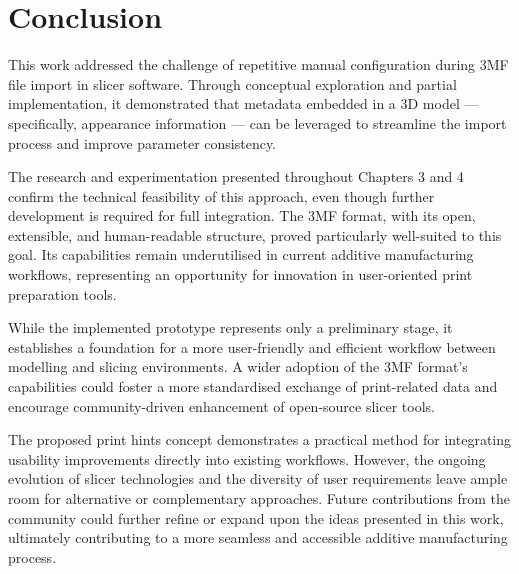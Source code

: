 \chapter{Conclusion}\label{ch:conclusion}

This work addressed the challenge of repetitive manual configuration during 3MF file import in slicer software. Through conceptual exploration and partial implementation, it demonstrated that metadata embedded in a 3D model — specifically, appearance information — can be leveraged to streamline the import process and improve parameter consistency.

The research and experimentation presented throughout Chapters 3 and 4 confirm the technical feasibility of this approach, even though further development is required for full integration. The 3MF format, with its open, extensible, and human-readable structure, proved particularly well-suited to this goal. Its capabilities remain underutilised in current additive manufacturing workflows, representing an opportunity for innovation in user-oriented print preparation tools.

While the implemented prototype represents only a preliminary stage, it establishes a foundation for a more user-friendly and efficient workflow between modelling and slicing environments. A wider adoption of the 3MF format’s capabilities could foster a more standardised exchange of print-related data and encourage community-driven enhancement of open-source slicer tools.

The proposed print hints concept demonstrates a practical method for integrating usability improvements directly into existing workflows. However, the ongoing evolution of slicer technologies and the diversity of user requirements leave ample room for alternative or complementary approaches. Future contributions from the community could further refine or expand upon the ideas presented in this work, ultimately contributing to a more seamless and accessible additive manufacturing process.